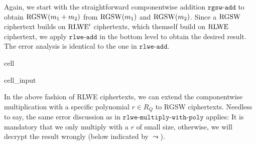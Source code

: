 \documentclass[letterpaper,10pt,english]{jupyterBook}
\begin{document}
\sphinxAtStartPar
Again, we start with the straightforward component\sphinxhyphen{}wise addition \(\texttt{rgsw-add}\) to obtain \(\mathrm{RGSW}(m_1+m_2)\) from \(\mathrm{RGSW}(m_1)\) and \(\mathrm{RGSW}(m_2)\).
Since a \(\mathrm{RGSW}\) ciphertext builds on \(\mathrm{RLWE'}\) ciphertexts, which themself build on \(\mathrm{RLWE}\) ciphertext, we apply \(\texttt{rlwe-add}\) in the bottom level to obtain the desired result.
The error analysis is identical to the one in \(\texttt{rlwe-add}\).

\begin{sphinxuseclass}{cell}\begin{sphinxVerbatimInput}

\begin{sphinxuseclass}{cell_input}
\begin{sphinxVerbatim}[commandchars=\\\{\}]
     
      \PYG{p}{[}\PYG{p}{]}
      \PYG{p}{[}\PYG{p}{[}\PYG{p}{[}\PYG{p}{]}    \PYG{p}{]}  \PYG{p}{[}\PYG{p}{[}\PYG{p}{]}    \PYG{p}{]}\PYG{p}{]}
       
           
            \PYG{p}{[}\PYG{p}{]}\PYG{p}{[}\PYG{p}{]}  \PYG{p}{[}\PYG{p}{]}\PYG{p}{[}\PYG{p}{]} \PYG{p}{[}\PYG{p}{]}\PYG{p}{[}\PYG{p}{]}              
     
\end{sphinxVerbatim}

\end{sphinxuseclass}\end{sphinxVerbatimInput}

\end{sphinxuseclass}
\sphinxAtStartPar
In the above fashion of RLWE ciphertexts, we can extend the component\sphinxhyphen{}wise multiplication with a specific polynomial \(r \in R_Q\) to RGSW ciphertexts.
Needless to say, the same error discussion as in \(\texttt{rlwe-multiply-with-poly}\) applies:
It is mandatory that we only multiply with a \(r\) of small size, otherwise, we will decrypt the result wrongly (below indicated by \(\leadsto\)).
\end{document}

